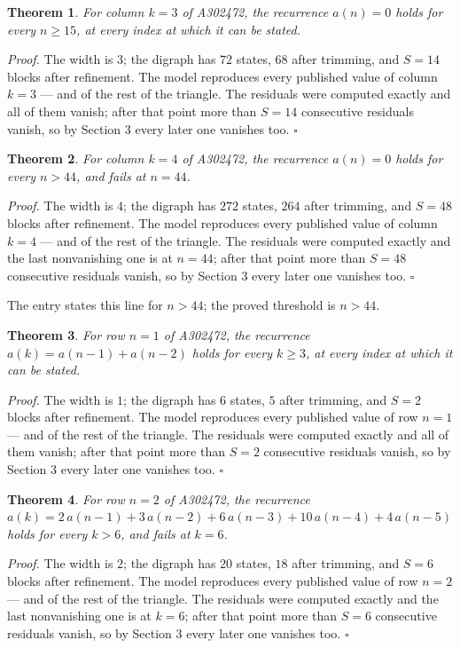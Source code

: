 \documentclass[11pt]{article}
\newtheorem{theorem}{Theorem}
\theoremstyle{definition}
\begin{document}
\begin{theorem} For column $k = 3$ of A302472, the recurrence $a(n) = 0$ holds for every $n \ge 15$, at every index at which it can be stated.\end{theorem}

{\itshape Proof.} The width is $3$; the digraph has $72$ states, $68$ after trimming, and $S = 14$ blocks after refinement. The model reproduces every published value of column $k = 3$ --- and of the rest of the triangle. The residuals were computed exactly and all of them vanish; after that point more than $S = 14$ consecutive residuals vanish, so by Section 3 every later one vanishes too. $\square$

\begin{theorem} For column $k = 4$ of A302472, the recurrence $a(n) = 0$ holds for every $n > 44$, and fails at $n = 44$.\end{theorem}

{\itshape Proof.} The width is $4$; the digraph has $272$ states, $264$ after trimming, and $S = 48$ blocks after refinement. The model reproduces every published value of column $k = 4$ --- and of the rest of the triangle. The residuals were computed exactly and the last nonvanishing one is at $n = 44$; after that point more than $S = 48$ consecutive residuals vanish, so by Section 3 every later one vanishes too. $\square$

The entry states this line for $n > 44$; the proved threshold is $n > 44$.

\begin{theorem} For row $n = 1$ of A302472, the recurrence $a(k) = a(n-1) + a(n-2)$ holds for every $k \ge 3$, at every index at which it can be stated.\end{theorem}

{\itshape Proof.} The width is $1$; the digraph has $6$ states, $5$ after trimming, and $S = 2$ blocks after refinement. The model reproduces every published value of row $n = 1$ --- and of the rest of the triangle. The residuals were computed exactly and all of them vanish; after that point more than $S = 2$ consecutive residuals vanish, so by Section 3 every later one vanishes too. $\square$

\begin{theorem} For row $n = 2$ of A302472, the recurrence $a(k) = 2\,a(n-1) + 3\,a(n-2) + 6\,a(n-3) + 10\,a(n-4) + 4\,a(n-5)$ holds for every $k > 6$, and fails at $k = 6$.\end{theorem}

{\itshape Proof.} The width is $2$; the digraph has $20$ states, $18$ after trimming, and $S = 6$ blocks after refinement. The model reproduces every published value of row $n = 2$ --- and of the rest of the triangle. The residuals were computed exactly and the last nonvanishing one is at $k = 6$; after that point more than $S = 6$ consecutive residuals vanish, so by Section 3 every later one vanishes too. $\square$
\end{document}
